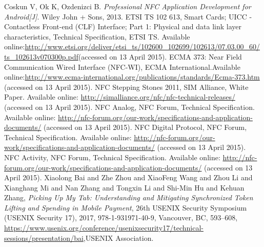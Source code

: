 \documentclass[journal]{IEEEtran}
\begin{document}
\begin{thebibliography}{1}
Coskun V, Ok K, Ozdenizci B. \emph{Professional NFC Application Development for Android[J]}. Wiley John + Sons, 2013.
ETSI TS 102 613, Smart Cards; UICC - Contactless Front-end (CLF) Interface; Part 1: Physical and data link layer characteristics, Technical Specification, ETSI TS. Available online:\url{http://www.etsi.org/deliver/etsi_ts/102600_102699/102613/07.03.00_60/ts_102613v070300p.pdf}(accessed on 13 April 2015).
ECMA 373: Near Field Communication Wired Interface (NFC-WI), ECMA International.Available online:\url{http://www.ecma-international.org/publications/standards/Ecma-373.htm}
(accessed on 13 April 2015).
NFC Stepping Stones 2011, SIM Alliance, White Paper. Available online: \url{http://simalliance.org/nfc/nfc-technical-releases/} (accessed on 13 April 2015).
NFC Analog, NFC Forum, Technical Specification. Available online: \url{http://nfc-forum.org/our-work/specifications-and-application-documents/} (accessed on 13 April 2015).
NFC Digital Protocol, NFC Forum, Technical Specification. Available online: \url{http://nfc-forum.org/our-work/specifications-and-application-documents/} (accessed on 13 April 2015).
NFC Activity, NFC Forum, Technical Specification. Available online: \url{http://nfc-forum.org/our-work/specifications-and-application-documents/} (accessed on 13 April 2015).
Xiaolong Bai and Zhe Zhou and XiaoFeng Wang and Zhou Li and Xianghang Mi and Nan Zhang and Tongxin Li and Shi-Min Hu and Kehuan Zhang,
\emph{Picking Up My Tab: Understanding and Mitigating Synchronized Token Lifting and Spending in Mobile Payment}, 26th {USENIX} Security Symposium ({USENIX} Security 17), 2017, 978-1-931971-40-9, Vancouver, BC, 593--608,
\url{https://www.usenix.org/conference/usenixsecurity17/technical-sessions/presentation/bai},{USENIX} Association.



\end{thebibliography}


% 
\end{document}
